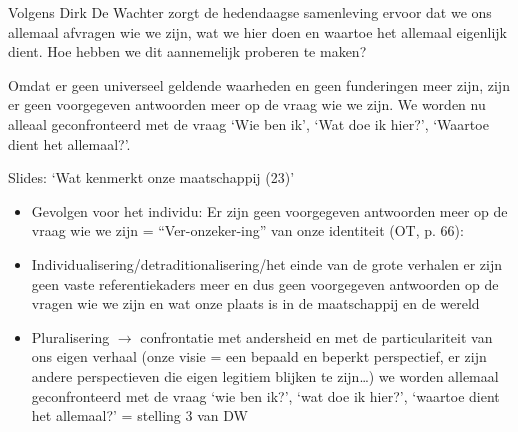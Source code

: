 \documentclass[main.tex]{subfiles}
\begin{document}
\begin{examenvraag}
    \begin{vraag}
        Volgens Dirk De Wachter zorgt de hedendaagse samenleving ervoor dat we ons allemaal afvragen wie we zijn, wat we hier doen en waartoe het allemaal eigenlijk dient. Hoe hebben we dit aannemelijk proberen te maken?
    \end{vraag}

    \begin{antwoord}
        Omdat er geen universeel geldende waarheden en geen funderingen meer zijn, zijn er geen voorgegeven antwoorden meer op de vraag wie we zijn.
        We worden nu alleaal geconfronteerd met de vraag `Wie ben ik', `Wat doe ik hier?', `Waartoe dient het allemaal?'.
        \begin{citaat}{Slides: `Wat kenmerkt onze maatschappij (23)'}
            \begin{itemize}
            \item Gevolgen voor het individu:
            Er zijn geen voorgegeven antwoorden meer op de vraag wie we zijn = “Ver-onzeker-ing” van onze identiteit (OT, p. 66):
            \item Individualisering/detraditionalisering/het einde van de grote verhalen er zijn geen vaste referentiekaders meer en dus geen voorgegeven antwoorden op de vragen wie we zijn en wat onze plaats is in de maatschappij en de wereld
            \item Pluralisering $\rightarrow$ confrontatie met andersheid en met de particulariteit van ons eigen verhaal (onze visie = een bepaald en beperkt perspectief, er zijn andere perspectieven die eigen legitiem blijken te zijn…) we worden allemaal geconfronteerd met de vraag ‘wie ben ik?’, ‘wat doe ik hier?’, ‘waartoe dient het allemaal?’ = stelling 3 van DW
    \end{itemize}
        \end{citaat}
    \end{antwoord}
\end{examenvraag}
\end{document}
